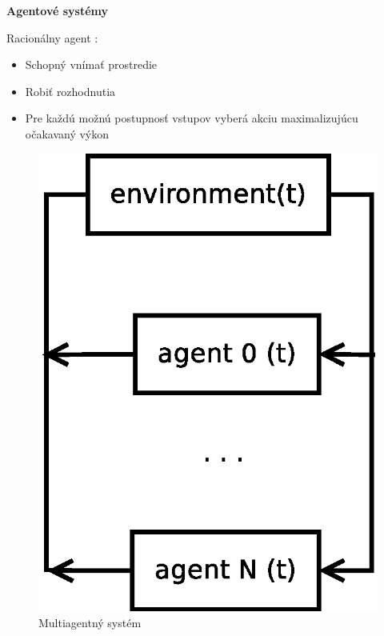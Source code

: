 \documentclass[xcolor=dvipsnames]{beamer}
\begin{document}
\begin{frame}{\bf Agentové systémy}

Racionálny agent :

\begin{minipage}{.5\textwidth}

  \begin{itemize}
  \item Schopný vnímať prostredie
  \item Robiť rozhodnutia
  \item Pre každú možnú postupnosť vstupov vyberá akciu maximalizujúcu očakavaný výkon
  \end{itemize}

\end{minipage}%
\begin{minipage}{.5\textwidth}

    \begin{figure}[!htb]
    \centering
    \includegraphics[scale=.3]{../diagrams/multiagent_diagram.eps}
    \caption{Multiagentný systém}
    \label{fig:multiagent_system}
    \end{figure}

\end{minipage}


\end{frame}
\end{document}
